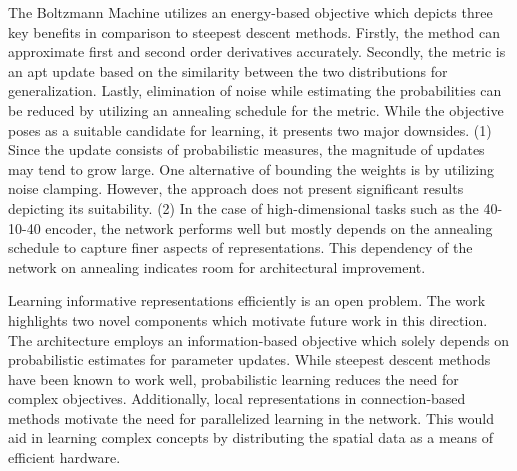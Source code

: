 \documentclass[11pt,letterpaper]{article}
\begin{document}
The Boltzmann Machine utilizes an energy-based objective which depicts three key benefits in comparison to steepest descent methods. Firstly, the method can approximate first and second order derivatives accurately. Secondly, the metric is an apt update based on the similarity between the two distributions for generalization. Lastly, elimination of noise while estimating the probabilities can be reduced by utilizing an annealing schedule for the metric. While the objective poses as a suitable candidate for learning, it presents two major downsides. (1) Since the update consists of probabilistic measures, the magnitude of updates may tend to grow large. One alternative of bounding the weights is by utilizing noise clamping. However, the approach does not present significant results depicting its suitability. (2) In the case of high-dimensional tasks such as the 40-10-40 encoder, the network performs well but mostly depends on the annealing schedule to capture finer aspects of representations. This dependency of the network on annealing indicates room for architectural improvement.  

Learning informative representations efficiently is an open problem. The work highlights two novel components which motivate future work in this direction. The architecture employs an information-based objective which solely depends on probabilistic estimates for parameter updates. While steepest descent methods have been known to work well, probabilistic learning reduces the need for complex objectives. Additionally, local representations in connection-based methods motivate the need for parallelized learning in the network. This would aid in learning complex concepts by distributing the spatial data as a means of efficient hardware. 
\end{document}

